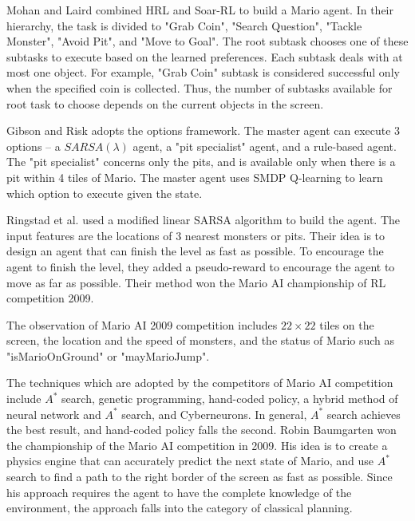 
Mohan and Laird \cite{Mohan09} combined HRL and Soar-RL \cite{Nason05} to build
a Mario agent. In their hierarchy, the task is divided to "Grab Coin", "Search Question", "Tackle Monster",
"Avoid Pit", and "Move to Goal". 
The root subtask chooses one of these subtasks to execute based on the learned
preferences. Each subtask deals with at most one object. For example, 
"Grab Coin" subtask is considered successful only when the specified 
coin is collected. Thus, the number of subtasks available for root task to choose
depends on the current objects in the screen.

Gibson and Risk \cite{Gibson09} adopts the options framework.
The master agent can execute 3 options -- a $SARSA(\lambda)$ agent, a "pit specialist" agent, and a
rule-based agent. The "pit specialist" concerns only the pits, and is available only when
there is a pit within 4 tiles of Mario. 
The master agent uses SMDP Q-learning to learn which option to execute given the state.

Ringstad et al. \cite{Paul09} 
used a modified linear SARSA algorithm to build the agent.
The input features are the locations of 3 nearest monsters or pits.
Their idea is to design an agent that can finish the level as fast as possible.
To encourage the agent to finish the level, they added a pseudo-reward to encourage
the agent to move as far as possible.
Their method won the Mario AI championship of RL competition 2009.


The observation of Mario AI 2009 competition \cite{Robin09} includes $22 \times 22$ tiles on the screen, the location and the speed of monsters, 
and the status of Mario such as "isMarioOnGround" or "mayMarioJump".

The techniques which are adopted by the competitors of Mario AI competition include
$A^*$ search, genetic programming, hand-coded policy, a hybrid method of neural network and $A^*$ search,
and Cyberneurons.
In general, $A^*$ search achieves the best result, and hand-coded policy falls the second.
Robin Baumgarten \cite{Robin09} won the championship of the Mario AI competition in 2009.
His idea is to create a physics engine that can accurately predict the next state of Mario, 
and use $A^*$ search to find a path to the right border of the screen as fast as possible.
Since his approach requires the agent to have the complete knowledge of the environment,
the approach falls into the category of classical planning.



